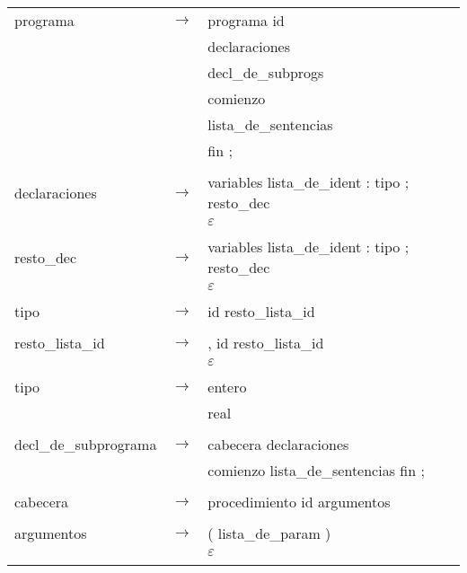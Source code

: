 \documentclass[11pt,twoside,a4paper]{book}
\begin{document}
\begin{tabular}{l c l}
programa & $ \rightarrow $ & programa id \\
                  & & declaraciones \\
                  & & decl\_de\_subprogs \\
                  & & comienzo \\
                  & & lista\_de\_sentencias \\
                  & & fin ; \\
\\

declaraciones & $ \rightarrow $ & variables lista\_de\_ident : tipo ; resto\_dec \\
                  & & $ \varepsilon $ \\
\\

resto\_dec & $ \rightarrow $ & variables lista\_de\_ident : tipo ; resto\_dec \\
                  & & $ \varepsilon $ \\
\\

tipo & $ \rightarrow $ & id resto\_lista\_id \\
\\

resto\_lista\_id & $ \rightarrow $ & , id resto\_lista\_id \\
                  & & $ \varepsilon $ \\
\\

tipo & $ \rightarrow $ & entero \\
                  & & real \\
\\

decl\_de\_subprograma & $ \rightarrow $ & cabecera declaraciones \\
                  & & comienzo lista\_de\_sentencias fin ; \\
\\

cabecera &  $ \rightarrow $  & procedimiento id argumentos\\
\\

argumentos &  $ \rightarrow $  & ( lista\_de\_param ) \\
                  & &  $ \varepsilon $ \\
\\


\end{tabular}
\end{document}
